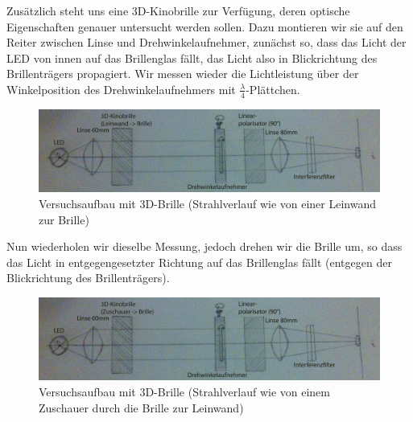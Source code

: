 \documentclass[bigchapter,colorback,accentcolor=tud4b,linedtoc,11pt]{tudreport}
\begin{document}
Zusätzlich steht uns eine 3D-Kinobrille zur Verfügung, deren optische Eigenschaften genauer untersucht werden sollen. Dazu montieren wir sie auf den Reiter zwischen Linse und Drehwinkelaufnehmer, zunächst so, dass das Licht der LED von innen auf das Brillenglas fällt, das Licht also in Blickrichtung des Brillenträgers propagiert. Wir messen wieder die Lichtleistung über der Winkelposition des Drehwinkelaufnehmers mit $\frac{\lambda}{4}$-Plättchen.

\begin{figure}[ht!]
\centering
\includegraphics[width=150mm]{img/skizzen/versuch_34_4.jpg}
\caption{Versuchsaufbau mit 3D-Brille (Strahlverlauf wie von einer Leinwand zur Brille)}
\end{figure}

\begin{center}
\begin{figure}[H]
\end{figure}
\end{center}

Nun wiederholen wir dieselbe Messung, jedoch drehen wir die Brille um, so dass das Licht in entgegengesetzter Richtung auf das Brillenglas fällt (entgegen der Blickrichtung des Brillenträgers).
\begin{figure}[ht!]
\centering
\includegraphics[width=150mm]{img/skizzen/versuch_34_5.jpg}
\caption{Versuchsaufbau mit 3D-Brille (Strahlverlauf wie von einem Zuschauer durch die Brille zur Leinwand)}
\end{figure}
\end{document}
